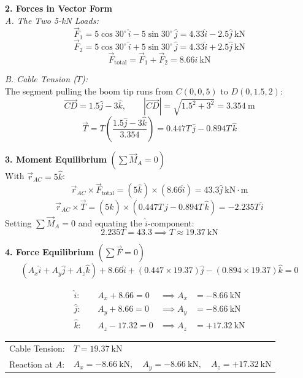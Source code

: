 \documentclass[12pt,a3paper]{article}
\begin{document}
\begin{enumerate}
\begin{tcolorbox}[enhanced,breakable,ansbox,colback=cD!4,colframe=cD,
  boxrule=0.8pt,arc=5pt,
  title={\textbf{Solution}},fonttitle=\bfseries\color{white},
  colbacktitle=cD]
\medskip
\textbf{2. Forces in Vector Form}\\[4pt]

\textit{A. The Two 5-kN Loads:}
\[
  \vec{F}_1 = 5\cos30^\circ\,\hat{i} - 5\sin30^\circ\,\hat{j}
            = 4.33\hat{i} - 2.5\hat{j}\ \text{kN}
\]
\[
  \vec{F}_2 = 5\cos30^\circ\,\hat{i} + 5\sin30^\circ\,\hat{j}
            = 4.33\hat{i} + 2.5\hat{j}\ \text{kN}
\]
\[
  \vec{F}_{\text{total}} = \vec{F}_1 + \vec{F}_2 = 8.66\hat{i}\ \text{kN}
\]

\textit{B. Cable Tension ($T$):}\\
The segment pulling the boom tip runs from $C(0,0,5)$ to $D(0,1.5,2)$:
\[
  \vec{CD} = 1.5\hat{j} - 3\hat{k}, \qquad
  |\vec{CD}| = \sqrt{1.5^2 + 3^2} = 3.354\ \text{m}
\]
\[
  \vec{T} = T\left(\frac{1.5\hat{j} - 3\hat{k}}{3.354}\right)
          = 0.447T\,\hat{j} - 0.894T\,\hat{k}
\]

\medskip
\textbf{3. Moment Equilibrium} $\left(\sum \vec{M}_A = 0\right)$\\[4pt]
With $\vec{r}_{AC} = 5\hat{k}$:
\[
  \vec{r}_{AC} \times \vec{F}_{\text{total}}
  = (5\hat{k}) \times (8.66\hat{i})
  = 43.3\hat{j}\ \text{kN}\!\cdot\!\text{m}
\]
\[
  \vec{r}_{AC} \times \vec{T}
  = (5\hat{k}) \times (0.447T\,\hat{j} - 0.894T\,\hat{k})
  = -2.235T\,\hat{i}
\]
Setting $\sum \vec{M}_A = 0$ and equating the $\hat{i}$-component:
\[
  2.235T = 43.3 \implies
  \boxed{T \approx 19.37\ \text{kN}}
\]

\medskip
\textbf{4. Force Equilibrium} $\left(\sum \vec{F} = 0\right)$\\[4pt]
\[
  (A_x\hat{i} + A_y\hat{j} + A_z\hat{k})
  + 8.66\hat{i}
  + (0.447 \times 19.37)\hat{j}
  - (0.894 \times 19.37)\hat{k} = 0
\]

\begin{align*}
  \hat{i}:&\quad A_x + 8.66 = 0  &\implies A_x &= -8.66\ \text{kN}\\
  \hat{j}:&\quad A_y + 8.66 = 0  &\implies A_y &= -8.66\ \text{kN}\\
  \hat{k}:&\quad A_z - 17.32 = 0 &\implies A_z &= +17.32\ \text{kN}
\end{align*}

\medskip
\begin{center}
\begin{tabular}{ll}
  Cable Tension:  & $T = 19.37\ \text{kN}$\\[4pt]
  Reaction at $A$: & $A_x = -8.66\ \text{kN},\quad
                     A_y = -8.66\ \text{kN},\quad
                     A_z = +17.32\ \text{kN}$
\end{tabular}
\end{center}


\end{tcolorbox}
\end{enumerate}
\end{document}
